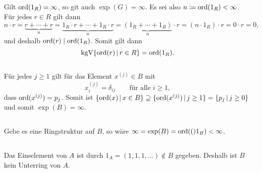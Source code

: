 \subsection{}

Gilt $\operatorname{ord}(1_R) = \infty$, so git auch $\exp(G) = \infty$.
Es sei also $n \coloneqq \operatorname{ord}(1_R) < \infty$.
Für jedes $r \in R$ gilt dann
\[
    n \cdot r
  = \underbrace{r + \dotsb + r}_{n}
  = \underbrace{ 1_R \cdot r + \dotsb + 1_R \cdot r }_{n}
  = \underbrace{(1_R + \dotsb + 1_R)}_{n} \cdot r
  = (n \cdot 1_R) \cdot r
  = 0 \cdot r
  = 0,
\]
und deshalb $\operatorname{ord}(r) \mathrel{|} \operatorname{ord}(1_R)$.
Somit gilt dann
\[
    \kgV \{\ord r \suchthat r \in R\}
  = \ord{1_R}.
\]





\subsection{}

Für jedes $j \geq 1$ gilt für das Element $x^{(j)} \in B$ mit
\[
    x^{(j)}_i
  = \delta_{ij}
  \qquad
  \text{für alle $i \geq 1$},
\]
dass $\operatorname{ord}( x^{(j)} ) = p_j$.
Somit ist $\{ \ord{x} \suchthat x \in B \} \supseteq \{ \ord{ x^{(j)} } \suchthat j \geq 1 \} = \{ p_j \suchthat j \geq 0\}$ und somit $\exp(B) = \infty$.





\subsection{}

Gebe es eine Ringstruktur auf $B$, so wäre $\infty = \exp(B) = \operatorname{ord}(()1_B) < \infty$.





\subsection{}

Das Einselement von $A$ ist durch $1_A = (1, 1, 1, \dotsc) \notin B$ gegeben.
Deshalb ist $B$ kein Unterring von $A$.




























